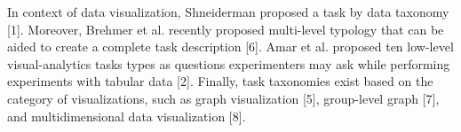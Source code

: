  In context of data visualization, Shneiderman proposed a task by data taxonomy [1]. Moreover, Brehmer et al. recently proposed multi-level typology that can be aided to create a complete task description [6]. Amar et al. proposed ten low-level visual-analytics tasks types as questions experimenters may ask while performing experiments with tabular data [2]. Finally, task taxonomies exist based on the category of visualizations, such as graph visualization [5], group-level graph [7], and multidimensional data visualization [8]. 